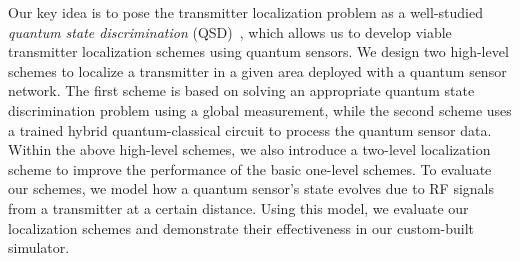 
Our key idea is to pose the transmitter localization problem as a well-studied \emph{quantum state discrimination} (QSD)~\cite{bergou2004,bergou-review-2007,Bae_2015}, 
which allows us to develop viable transmitter localization schemes using quantum sensors. 
We design two high-level schemes to localize a transmitter in a given area deployed with a quantum sensor network.
The first scheme is based on solving an appropriate quantum state discrimination problem using a global measurement, 
while the second scheme uses a trained hybrid quantum-classical circuit to process the quantum sensor data. 
Within the above high-level schemes, we also introduce a two-level localization scheme to improve the performance of the basic one-level schemes.
To evaluate our schemes, we model how a quantum sensor's state evolves due to RF signals from a transmitter at a certain distance. 
Using this model, we evaluate our localization schemes and demonstrate their effectiveness in our custom-built simulator.

